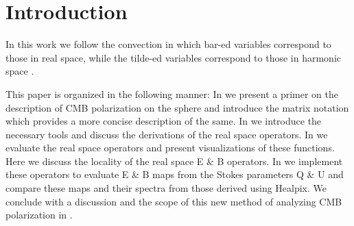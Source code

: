 \section{Introduction}

In this work we follow the convection in which bar-ed variables correspond to those in real space, while the tilde-ed variables correspond to those in harmonic space \cite{Zaldarriaga2001a}. 

This paper is organized in the following manner: In  we present a primer on the description of CMB polarization on the sphere and introduce the matrix notation which provides a more concise description of the same. In  we introduce the necessary tools  and discuss the derivations of the real space operators. In  we evaluate the real space operators and present visualizations of these functions. Here we discuss the locality of the real space E \& B operators. In  we implement these operators to evaluate E \& B  maps from the Stokes parameters Q \& U and compare these maps and their spectra from those derived using Healpix. We conclude with a discussion and the scope of this new method of analyzing CMB polarization in .